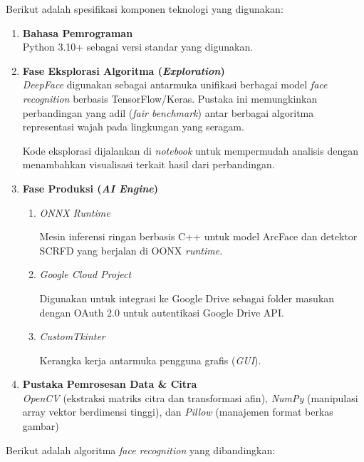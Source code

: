 Berikut adalah spesifikasi komponen teknologi yang digunakan:
\begin{enumerate}
    \item \textbf{Bahasa Pemrograman}\\
    Python 3.10+ sebagai versi standar yang digunakan.

    \item \textbf{Fase Eksplorasi Algoritma (\textit{Exploration})}\\
    \textit{DeepFace} digunakan sebagai antarmuka unifikasi berbagai model \textit{face recognition} berbasis TensorFlow/Keras. Pustaka ini memungkinkan perbandingan yang adil (\textit{fair benchmark}) antar berbagai algoritma representasi wajah pada lingkungan yang seragam.

    Kode eksplorasi dijalankan di \textit{notebook} untuk mempermudah analisis dengan menambahkan visualisasi terkait hasil dari perbandingan.

    \item \textbf{Fase Produksi (\textit{AI Engine})}
    \begin{enumerate}
        \item \textit{ONNX Runtime}

        Mesin inferensi ringan berbasis C++ untuk model ArcFace dan detektor SCRFD yang berjalan di OONX \textit{runtime}.

        \item \textit{Google Cloud Project}
        
        Digunakan untuk integrasi ke Google Drive sebagai folder masukan dengan OAuth 2.0 untuk autentikasi Google Drive API.

        \item \textit{CustomTkinter}

        Kerangka kerja antarmuka pengguna grafis (\textit{GUI}).
    \end{enumerate}

    \item \textbf{Pustaka Pemrosesan Data \& Citra}\\
    \textit{OpenCV} (ekstraksi matriks citra dan transformasi afin), \textit{NumPy} (manipulasi array vektor berdimensi tinggi), dan \textit{Pillow} (manajemen format berkas gambar)
\end{enumerate}

Berikut adalah algoritma \textit{face recognition} yang dibandingkan:

